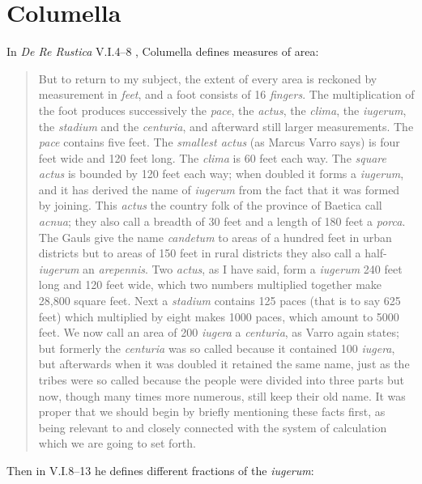 \documentclass{amsart}
\theoremstyle{definition}
\begin{document}
 





\section{Columella}
In {\em De Re Rustica} V.I.4--8 \cite[pp.~5--7]{columellaII}, Columella defines  measures of area:

\begin{quote}
But to return to my subject, the extent of every area is reckoned by measurement in {\em feet}, and a foot consists of 16 {\em fingers}. The multiplication of the foot produces 
successively the {\em pace}, the {\em actus}, the {\em clima}, the {\em iugerum}, the {\em stadium} and the {\em centuria}, and afterward still larger measurements. The {\em pace} 
contains five feet. The {\em smallest actus} (as Marcus Varro says) is four feet wide and 120 feet long. The {\em clima} is 60 feet each way. The {\em square actus} is bounded by
120 feet each way; when doubled it forms a {\em iugerum}, and it has derived the name of {\em iugerum} from the fact that it was formed by joining. This {\em actus} the country folk
of the province of Baetica call {\em acnua}; they also call a breadth of 30 feet and a length of 180 feet a {\em porca}. The Gauls give the name  {\em candetum} to areas of a
hundred feet in urban districts but to areas of 150 feet in rural districts they also call a half-{\em iugerum} an {\em arepennis}. Two {\em actus}, as I have said, form a {\em iugerum} 
240 feet long and 120 feet wide, which two numbers multiplied together make 28,800 square feet. Next a {\em stadium} contains 125 paces (that is to say 625 feet) which
multiplied by eight makes 1000 paces, which amount to 5000 feet. We now call an area of 200 {\em iugera} a {\em centuria}, as Varro again states; but formerly the {\em centuria}
was so called because it contained 100 {\em iugera}, but afterwards when it was doubled it retained the same name, just as the tribes were so called because the people were 
divided into three parts but now, though many times more numerous, still keep their old name. It was proper that we should begin by briefly mentioning these facts first, as being 
relevant to and closely connected with the system of calculation which we are going to set forth.
\end{quote}

Then in V.I.8--13 \cite[pp.~9--13]{columellaII} he defines different fractions of the {\em iugerum}:
\end{document}
